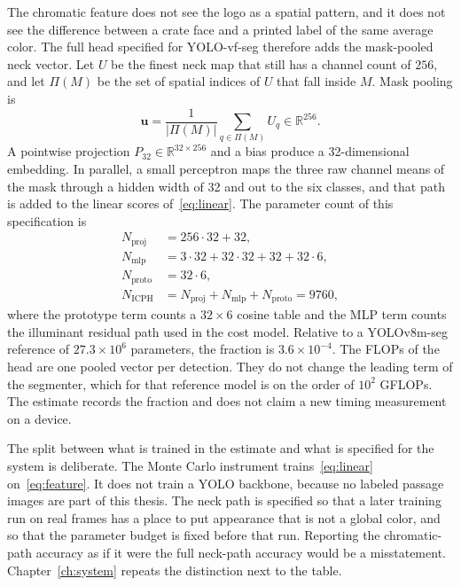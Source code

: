 The chromatic feature does not see the logo as a spatial pattern, and it does not see the difference between a crate face and a printed label of the same average color. The full head specified for YOLO-vf-seg therefore adds the mask-pooled neck vector. Let $U$ be the finest neck map that still has a channel count of $256$, and let $\Pi(M)$ be the set of spatial indices of $U$ that fall inside $M$. Mask pooling is
\begin{equation}
\mathbf{u}
= \frac{1}{\lvert\Pi(M)\rvert}
\sum_{q\in\Pi(M)} U_{q}
\in\mathbb{R}^{256}.
\label{eq:pool}
\end{equation}
A pointwise projection $P_{32}\in\mathbb{R}^{32\times 256}$ and a bias produce a 32-dimensional embedding. In parallel, a small perceptron maps the three raw channel means of the mask through a hidden width of 32 and out to the six classes, and that path is added to the linear scores of~\eqref{eq:linear}. The parameter count of this specification is
\begin{equation}
\begin{aligned}
N_{\text{proj}} &= 256\cdot 32 + 32,\\
N_{\text{mlp}} &= 3\cdot 32 + 32\cdot 32 + 32 + 32\cdot 6,\\
N_{\text{proto}} &= 32\cdot 6,\\
N_{\text{ICPH}} &= N_{\text{proj}}+N_{\text{mlp}}+N_{\text{proto}} = 9760,
\end{aligned}
\label{eq:params}
\end{equation}
where the prototype term counts a $32\times 6$ cosine table and the MLP term counts the illuminant residual path used in the cost model. Relative to a YOLOv8m-seg reference of $27.3\times 10^{6}$ parameters, the fraction is $3.6\times 10^{-4}$. The FLOPs of the head are one pooled vector per detection. They do not change the leading term of the segmenter, which for that reference model is on the order of $10^{2}$ GFLOPs. The estimate records the fraction and does not claim a new timing measurement on a device.

The split between what is trained in the estimate and what is specified for the system is deliberate. The Monte Carlo instrument trains~\eqref{eq:linear} on~\eqref{eq:feature}. It does not train a YOLO backbone, because no labeled passage images are part of this thesis. The neck path is specified so that a later training run on real frames has a place to put appearance that is not a global color, and so that the parameter budget is fixed before that run. Reporting the chromatic-path accuracy as if it were the full neck-path accuracy would be a misstatement. Chapter~\ref{ch:system} repeats the distinction next to the table.

